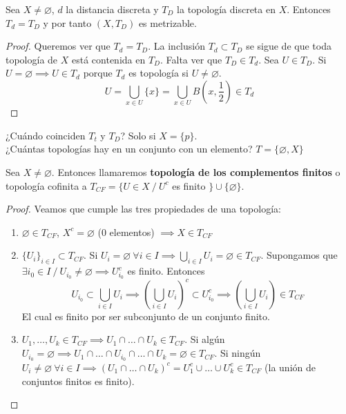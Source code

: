 \begin{properties}
  Sea $X \neq \varnothing $, $d$ la distancia discreta y $T_D$ la topología discreta en $X$. Entonces $T_d=T_D$ y por tanto $(X,T_D)$ es metrizable.
\end{properties}
\begin{proof}
  Queremos ver que $T_d = T_D$. La inclusión $T_d \subset T_D$ se sigue de que toda topología de $X$ está contenida en $T_D$. Falta ver que $T_D \in T_d$. Sea $U \in T_D$. Si $U=\varnothing \implies U \in T_d$ porque $T_d$ es topología si $U \neq \varnothing $. \[U = \bigcup_{x \in U} \{x\} = \bigcup_{x \in U} B(x,\frac{1}{2}) \in T_d \]
\end{proof}
¿Cuándo coinciden $T_t$ y $T_D$? Solo si $X=\{p\}$.\\
¿Cuántas topologías hay en un conjunto con un elemento? $T=\{\varnothing ,X\}$

\begin{exmp}
  Sea $X \neq \varnothing $. Entonces llamaremos \textbf{topología de los complementos finitos} o topología cofinita a $T_{CF}=\{U \in X\ /\ U^c$ es finito $\} \cup \{\varnothing \}$.
\end{exmp}
\begin{proof}
  Veamos que cumple las tres propiedades de una topología:
  \begin{enumerate}
    \item $\varnothing \in T_{CF}$, $X^c = \varnothing $ (0 elementos) $\implies X \in T_{CF}$
    \item $\{U_i\}_{i \in I} \subset T_{CF}$. Si $U_i = \varnothing \ \forall i \in I \implies \bigcup_{i \in I} U_i = \varnothing \in T_{CF}$. Supongamos que $\exists i_0 \in I\ /\ U_{i_0} \neq \varnothing \implies U^c_{i_0}$ es finito. Entonces \[U_{i_0} \subset \bigcup_{i \in I} U_i \implies \left(\bigcup_{i \in I} U_i \right )^c \subset U_{i_0}^c \implies \left( \bigcup_{i \in I} U_i \right) \in T_{CF} \] El cual es finito por ser subconjunto de un conjunto finito.
    \item $U_1,\ldots,U_k \in T_{CF} \implies U_1 \cap\ldots\cap U_k \in T_{CF}$. Si algún $U_{i_0} = \varnothing \implies U_1 \cap \ldots \cap U_{i_0} \cap \ldots \cap U_k = \varnothing \in T_{CF}$. Si ningún $U_i \neq \varnothing \ \forall i \in I \implies (U_1 \cap \ldots \cap U_k)^c = U_1^c \cup \ldots \cup U_k^c \in  T_{CF}$ (la unión de conjuntos finitos es finito).
  \end{enumerate}
\end{proof}

